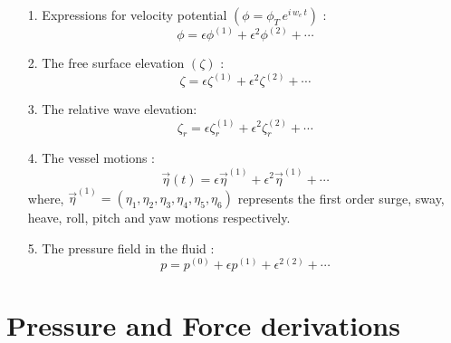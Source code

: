 \begin{itemize}
    \item [1.] Expressions for velocity potential $\left(\phi = \phi_T\,e^{i\,w_e\,t}\right)$ :
    \begin{equation}
        \phi = \epsilon \phi^{(1)} + \epsilon^2 \phi^{(2)} + \cdots
    \end{equation}

    \item [2.] The free surface elevation $(\zeta)$ :
    \begin{equation}
        \zeta = \epsilon \zeta^{(1)} + \epsilon^2 \zeta^{(2)} + \cdots
    \end{equation}

    \item [3.] The relative wave elevation:
    \begin{equation}
        \zeta_r = \epsilon \zeta_r^{(1)} + \epsilon^2 \zeta_r^{(2)} + \cdots
    \end{equation}

    \item [4.] The vessel motions :
    \begin{equation}
        \vec{\eta}(t) = \epsilon \vec{\eta}^{(1)} + \epsilon^2 \vec{\eta}^{(1)} + \cdots
    \end{equation}
    where, $\vec{\eta}^{(1)} = (\eta_1, \eta_2, \eta_3, \eta_4, \eta_5, \eta_6)$ represents the first order surge, 
    sway, heave, roll, pitch and yaw motions respectively.

    \item [5.] The pressure field in the fluid :
    \begin{equation}
        \label{eq:per_perssure}
        p = p^{(0)} + \epsilon p^{(1)} + \epsilon^{2} {^{(2)}} + \cdots
    \end{equation}
\end{itemize}

\section{Pressure and Force derivations}
